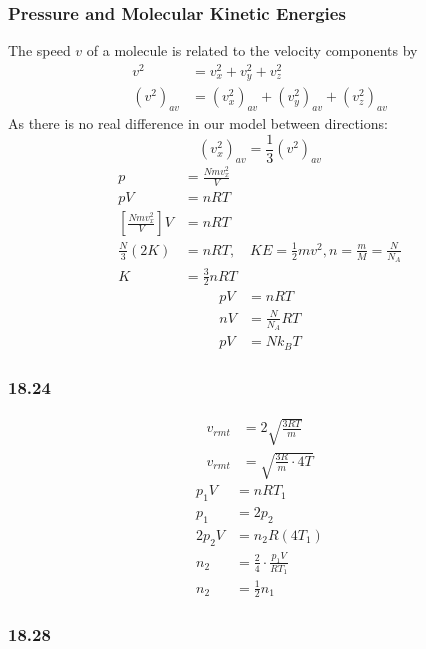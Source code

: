\documentclass{article}
\begin{document}
\subsubsection{Pressure and Molecular Kinetic Energies}

The speed $ v $ of a molecule is related to the velocity components by
\begin{align}
	v^2 & = v_x^2 + v_y^2 + v_z^2 \\
	(v^2)_{av} & = (v_x^2)_{av} + (v_y^2)_{av} + (v_z^2)_{av}
\end{align}
As there is no real difference in our model between directions:
\begin{equation}
	(v_x^2)_{av} = \frac{1}{3}(v^2)_{av}
\end{equation}
\begin{align*}
	p & = \frac{ Nmv_{x}^2 }{ V } \\
	pV & = nRT \\
	\left[ \frac{ Nmv_{x}^2 }{ V } \right]V & = nRT \\
	\frac{ N }{ 3 } \left( 2K \right) & = nRT, \quad KE = \frac{1}{2}mv^2, n = \frac{ m }{ M } = \frac{ N }{ N_A } \\
	K & = \frac{3}{2} nRT
\end{align*}
\begin{align*}
	pV & = nRT \\
	nV & = \frac{ N }{ N_A } RT \\
	pV & = Nk_BT
\end{align*}

\subsubsection{18.24}

\begin{align*}
	v_{rmt} & = 2\sqrt{ \frac{ 3RT }{ m } } \\
	v_{rmt} & = \sqrt{ \frac{ 3R }{ m } \cdot 4T }
\end{align*}
\begin{align*}
	p_1V & = nRT_1 \\
	p_1 & = 2p_2 \\
	2p_2V & = n_2R(4T_1) \\
	n_2 & = \frac{ 2 }{ 4 } \cdot \frac{ p_1V }{ RT_1 } \\
	n_2 & = \frac{1}{2}n_1
\end{align*}

\subsubsection{18.28}
\end{document}
